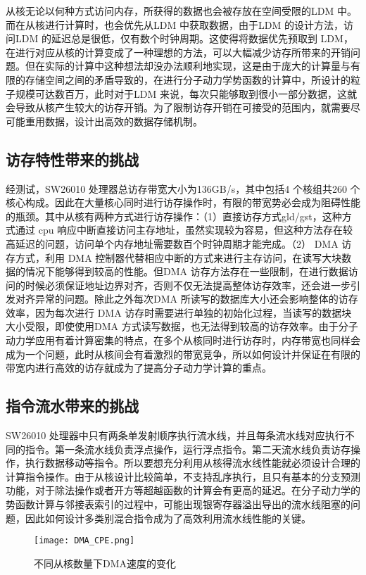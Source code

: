 从核无论以何种方式访问内存，所获得的数据也会被存放在空间受限的LDM 中。而在从核进行计算时，也会优先从LDM 中获取数据，由于LDM 的设计方法，访问LDM 的延迟总是很低，仅有数个时钟周期。这使得将数据优先预取到 LDM，在进行对应从核的计算变成了一种理想的方法，可以大幅减少访存所带来的开销问题。但在实际的计算中这种想法却没办法顺利地实现，这是由于庞大的计算量与有限的存储空间之间的矛盾导致的，在进行分子动力学势函数的计算中，所设计的粒子规模可达数百万，此时对于LDM 来说，每次只能够取到很小一部分数据，这就会导致从核产生较大的访存开销。为了限制访存开销在可接受的范围内，就需要尽可能重用数据，设计出高效的数据存储机制。

\subsection{访存特性带来的挑战}
经测试，SW26010 处理器总访存带宽大小为136GB/s，其中包括4 个核组共260 个核心构成。因此在大量核心同时进行访存操作时，有限的带宽势必会成为阻碍性能的瓶颈。其中从核有两种方式进行访存操作：（1）直接访存方式gld/gst，这种方式通过 cpu 响应中断直接访问主存地址，虽然实现较为容易，但这种方法存在较高延迟的问题，访问单个内存地址需要数百个时钟周期才能完成。（2） DMA 访存方式，利用 DMA 控制器代替相应中断的方式来进行主存访问，在读写大块数据的情况下能够得到较高的性能。但DMA 访存方法存在一些限制，在进行数据访问的时候必须保证地址边界对齐，否则不仅无法提高整体访存效率，还会进一步引发对齐异常的问题。除此之外每次DMA 所读写的数据库大小还会影响整体的访存效率，因为每次进行 DMA 访存时需要进行单独的初始化过程，当读写的数据块大小受限，即使使用DMA 方式读写数据，也无法得到较高的访存效率。由于分子动力学应用有着计算密集的特点，在多个从核同时进行访存时，内存带宽也同样会成为一个问题，此时从核间会有着激烈的带宽竞争，所以如何设计并保证在有限的带宽内进行高效的访存就成为了提高分子动力学计算的重点。

\subsection{指令流水带来的挑战}
SW26010 处理器中只有两条单发射顺序执行流水线，并且每条流水线对应执行不同的指令。第一条流水线负责浮点操作，运行浮点指令。第二天流水线负责访存操作，执行数据移动等指令。所以要想充分利用从核得流水线性能就必须设计合理的计算指令操作。由于从核设计比较简单，不支持乱序执行，且只有基本的分支预测功能，对于除法操作或者开方等超越函数的计算会有更高的延迟。在分子动力学的势函数计算与邻接表索引的过程中，可能出现银寄存器溢出导出的流水线阻塞的问题，因此如何设计多类别混合指令成为了高效利用流水线性能的关键。

 \begin{figure}[h]
  \centering
  \texttt{[image: DMA\_CPE.png]}
  \caption{不同从核数量下DMA速度的变化}
\end{figure}

